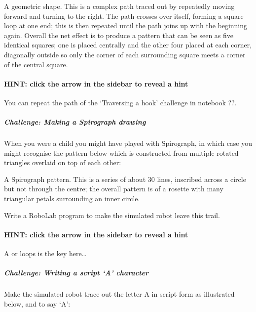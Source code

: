 \documentclass[letterpaper,10pt,english]{sphinxmanual}
\let\sphinxpxdimen\pdfpxdimen\else\newdimen\sphinxpxdimen
\begin{document}
A geometric shape. This is a complex path traced out by repeatedly moving forward and turning to the right. The path crosses over itself, forming a square loop at one end; this is then repeated until the path joins up with the beginning again. Overall the net effect is to produce a pattern that can be seen as five identical squares; one is placed centrally and the other four placed at each corner, diagonally outside so only the corner of each surrounding square meets a corner of the central
square.


\paragraph{HINT: click the arrow in the sidebar to reveal a hint}
\label{\detokenize{content/02_Robot_Lab/Section_00_04:HINT:-click-the-arrow-in-the-sidebar-to-reveal-a-hint}}
You can repeat the path of the ‘Traversing a hook’ challenge in notebook ??.


\subparagraph{Challenge: Making a Spirograph drawing}
\label{\detokenize{content/02_Robot_Lab/Section_00_04:Challenge:-Making-a-Spirograph-drawing}}
When you were a child you might have played with Spirograph, in which case you might recognise the pattern below which is constructed from multiple rotated triangles overlaid on top of each other: 

\sphinxincludegraphics[width=97\sphinxpxdimen,height=97\sphinxpxdimen]{{tm129_rob_p3_f024}.gif}

A Spirograph pattern. This is a series of about 30 lines, inscribed across a circle but not through the centre; the overall pattern is of a rosette with many triangular petals surrounding an inner circle.

Write a RoboLab program to make the simulated robot leave this trail.


\paragraph{HINT: click the arrow in the sidebar to reveal a hint}
\label{\detokenize{content/02_Robot_Lab/Section_00_04:id1}}
A  or  loops is the key here…


\subparagraph{Challenge: Writing a script ‘A’ character}
\label{\detokenize{content/02_Robot_Lab/Section_00_04:Challenge:-Writing-a-script-_u2018A_u2019-character}}
Make the simulated robot trace out the letter A in script form as illustrated below, and to say ‘A’:
\end{document}
